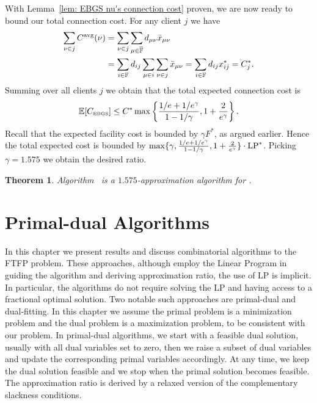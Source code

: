 \documentclass[oneside,final]{ucr}
\newtheorem{theorem}{Theorem}
\begin{document}
With Lemma~\ref{lem: EBGS nu's connection cost} proven, we are now ready to bound our total connection cost.
For any client $j$ we have
%
\begin{align*}
\sum_{\nu\in j} C^{{\mbox{\scriptsize\rm avg}}}(\nu)
	&= \sum_{\nu\in j}\sum_{\mu\in\overline{\mathbb{F}}} d_{\mu\nu}{\bar x}_{\mu\nu} 
	\\
	&= \sum_{i\in\mathbb{F}}d_{ij}\sum_{\mu\in i}\sum_{\nu\in j} {\bar x}_{\mu\nu}
	= \sum_{i\in\mathbb{F}} d_{ij}x_{ij}^\ast = C_j^\ast.
\end{align*}
% 
Summing over all clients $j$ we obtain that the total expected connection cost is
%
\begin{equation*}
	\mathbb{E}[ C_{\mbox{\tiny\rm EBGS}} ] \le  C^\ast\max\left\{\frac{1/e+1/e^\gamma}{1-1/\gamma}, 1+\frac{2}{e^\gamma}\right\}.
\end{equation*}
%
Recall that the expected facility cost is bounded by $\gamma F^\ast$,
as argued earlier. Hence the total expected cost is bounded by $\max\{\gamma,
\frac{1/e+1/e^\gamma}{1-1/\gamma}, 1+\frac{2}{e^\gamma}\}\cdot
\mbox{\rm LP}^\ast$. Picking $\gamma=1.575$ we obtain the desired ratio.


\begin{theorem}\label{thm:ebgs}
  Algorithm~{\EBGS} is a $1.575$-approximation algorithm for \FTFP.
\end{theorem}

\chapter{Primal-dual Algorithms} 
\label{ch: primal-dual} 

In this chapter we present results and discuss combinatorial
algorithms to the FTFP problem. These approaches, although
employ the Linear Program in guiding the algorithm and
deriving approximation ratio, the use of LP is implicit. In
particular, the algorithms do not require solving the LP and
having access to a fractional optimal solution. Two notable
such approaches are primal-dual and dual-fitting. In this
chapter we assume the primal problem is a minimization
problem and the dual problem is a maximization problem, to
be consistent with our {\FTFP} problem. In primal-dual
algorithms, we start with a feasible dual solution, usually
with all dual variables set to zero, then we raise a subset
of dual variables and update the corresponding primal
variables accordingly. At any time, we keep the dual
solution feasible and we stop when the primal solution
becomes feasible. The approximation ratio is derived by a
relaxed version of the complementary slackness conditions.
\end{document}
